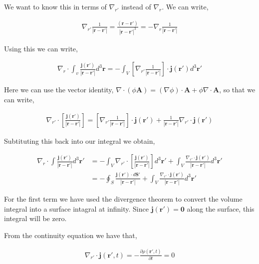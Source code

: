 \documentclass[11pt]{amsart}
\begin{document}
We want to know this in terms of $\nabla_{r'}$ instead of $\nabla_r$. We can write,

\begin{align*}
  \nabla_{r'} \frac{1}{|\mathbf{r}-\mathbf{r'}|} = \frac{(\mathbf{r}-\mathbf{r'})}{{|\mathbf{r}-\mathbf{r'}|}^3} = -\nabla_r\frac{1}{|\mathbf{r}-\mathbf{r'}|}
\end{align*}

Using this we can write,

\begin{align*}
  \nabla_r\cdot\int_v\frac{\mathbf{j}(\mathbf{r'})}{|\mathbf{r}-\mathbf{r'}|}d^3\mathbf{r}=-\int_V\left[\nabla_{r'}\frac{1}{|\mathbf{r}-\mathbf{r'}|}\right]\cdot\mathbf{j}(\mathbf{r'})d^3\mathbf{r'}
\end{align*}

Here we can use the vector identity, $\nabla\cdot(\phi\mathbf{A})=(\nabla\phi)\cdot\mathbf{A}+\phi\nabla\cdot\mathbf{A}$, so that we can write,

\begin{align*}
  \nabla_{r'}\cdot\left[\frac{\mathbf{j}(\mathbf{r'})}{|\mathbf{r}-\mathbf{r'}|}\right] = \left[\nabla_{r'}\frac{1}{|\mathbf{r}-\mathbf{r'}|}\right]\cdot\mathbf{j}(\mathbf{r'}) + \frac{1}{|\mathbf{r}-\mathbf{r'}|}\nabla_{r'}\cdot\mathbf{j}(\mathbf{r'})
\end{align*}

Subtituting this back into our integral we obtain,

\begin{align*}
  \nabla_r\cdot\int\frac{\mathbf{j}(\mathbf{r'})}{|\mathbf{r}-\mathbf{r'}|}d^3\mathbf{r'}&=-\int_V\nabla_{r'}\cdot\left[\frac{\mathbf{j}(\mathbf{r'})}{|\mathbf{r}-\mathbf{r'}|}\right]d^3\mathbf{r'} + \int_V\frac{\nabla_{r'}\cdot\mathbf{j}(\mathbf{r'})}{|\mathbf{r}-\mathbf{r'}|}d^3\mathbf{r'} \\
  &=-\oint_S\frac{\mathbf{j}(\mathbf{r'})\cdot d\mathbf{S'}}{|\mathbf{r}-\mathbf{r'}|} + \int_V\frac{\nabla_{r'}\cdot\mathbf{j}(\mathbf{r'})}{|\mathbf{r}-\mathbf{r'}|}d^3\mathbf{r'}
\end{align*}


For the first term we have used the divergence theorem to convert the volume integral into a surface intagral at infinity. Since $\mathbf{j}(\mathbf{r'})=\mathbf{0}$ along the surface, this integral will be zero.

From the continuity equation we have that,

\begin{align}
  \label{eq:continuity}
  \nabla_{r'}\cdot\mathbf{j}(\mathbf{r'}, t) = -\frac{\partial\rho(\mathbf{r'}, t)}{\partial t} = 0
\end{align}
\end{document}
